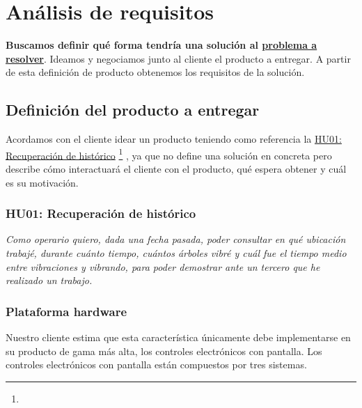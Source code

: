 \chapter{Análisis de requisitos}

\textbf{Buscamos definir qué forma tendría una solución al
\hyperref[sec:problema_a_resolver]{problema a resolver}}.
Ideamos y negociamos junto al cliente el producto a entregar.
A partir de esta definición de producto obtenemos los requisitos
de la solución.

\section{Definición del producto a entregar}

Acordamos con el cliente idear un producto teniendo como referencia la
\hyperref[sec:HU01]{HU01: Recuperación de histórico}%
\footnote{%
}%
, ya que
no define una solución en concreta pero describe cómo interactuará
el cliente con el producto, qué espera obtener y cuál es su motivación.

\subsection{HU01: Recuperación de histórico} \label{sec:HU01}

{ \itshape Como operario quiero, dada una fecha pasada, poder consultar
en qué ubicación trabajé, durante cuánto tiempo, cuántos
árboles vibré y cuál fue el tiempo medio entre
vibraciones y vibrando, para poder demostrar ante un tercero
que he realizado un trabajo. }

\subsection{Plataforma hardware}

Nuestro cliente estima que esta característica únicamente debe implementarse
en su producto de gama más alta, los controles electrónicos con pantalla.
Los controles electrónicos con pantalla están compuestos por tres sistemas.

